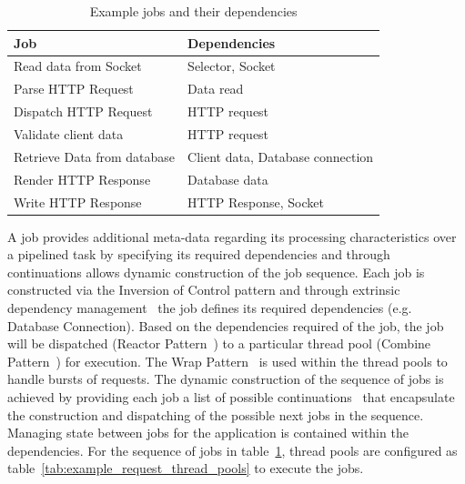 \documentclass[conference]{ieee/IEEEtran}
\begin{document}
\begin{table}[!t]
\renewcommand{\arraystretch}{1.3}
\caption{Example jobs and their dependencies}
\label{tab:example_request_jobs}
\centering
\begin{tabular}{l||l}
\hline
\bfseries Job & \bfseries Dependencies \\
\hline\hline
Read data from Socket & Selector, Socket \\
\hline
Parse HTTP Request & Data read \\
\hline
Dispatch HTTP Request & HTTP request \\
\hline
Validate client data & HTTP request \\
\hline
Retrieve Data from database & Client data, Database connection \\
\hline
Render HTTP Response & Database data \\
\hline
Write HTTP Response & HTTP Response, Socket \\
\hline
\end{tabular}
\end{table}

A job provides additional meta-data regarding its processing characteristics
over a pipelined task by specifying its required dependencies and through
continuations allows dynamic construction of the job sequence.  Each job is
constructed via the Inversion of Control pattern and through extrinsic
dependency management~\cite{ioc} the job defines its required dependencies (e.g.
Database Connection).  Based on the dependencies required of the job, the job
will be dispatched (Reactor Pattern~\cite{reactor}) to a particular thread pool
(Combine Pattern~\cite{pipeline}) for execution.  The Wrap
Pattern~\cite{pipeline} is used within the thread pools to handle bursts of
requests.  The dynamic construction of the sequence of jobs is achieved by
providing each job a list of possible continuations~\cite{continuations} that
encapsulate the construction and dispatching of the possible next jobs in the
sequence. Managing state between jobs for the application is contained within
the dependencies.  For the sequence of jobs in
table~\ref{tab:example_request_jobs}, thread pools are configured as
table~\ref{tab:example_request_thread_pools} to execute the jobs.
\end{document}
